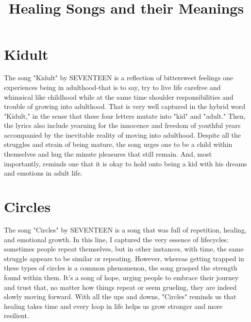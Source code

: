 \documentclass[12pt]{article}
\begin{document}
\title{Healing Songs and their Meanings}
\author{}
\date{}

\maketitle

\thispagestyle{fancy}
\pagestyle{fancy}

\section{Kidult}
The song "Kidult" by SEVENTEEN is a reflection of bittersweet feelings one experiences being in adulthood-that is to say, try to live life carefree and whimsical like childhood while at the same time shoulder responsibilities and trouble of growing into adulthood. That is very well captured in the hybrid word "Kidult," in the sense that these four letters mutate into "kid" and "adult." Then, the lyrics also include yearning for the innocence and freedom of youthful years accompanied by the inevitable reality of moving into adulthood. Despite all the struggles and strain of being mature, the song urges one to be a child within themselves and hug the minute pleasures that still remain. And, most importantly, reminds one that it is okay to hold onto being a kid with his dreams and emotions in adult life.

\section{Circles}
The song "Circles" by SEVENTEEN is a song that was full of repetition, healing, and emotional growth. In this line, I captured the very essence of lifecycles: sometimes people repeat themselves, but in other instances, with time, the same struggle appears to be similar or repeating. However, whereas getting trapped in these types of circles is a common phenomenon, the song grasped the strength found within them. It's a song of hope, urging people to embrace their journey and trust that, no matter how things repeat or seem grueling, they are indeed slowly moving forward. With all the ups and downs, "Circles" reminds us that healing takes time and every loop in life helps us grow stronger and more resilient.
 
\end{document}
